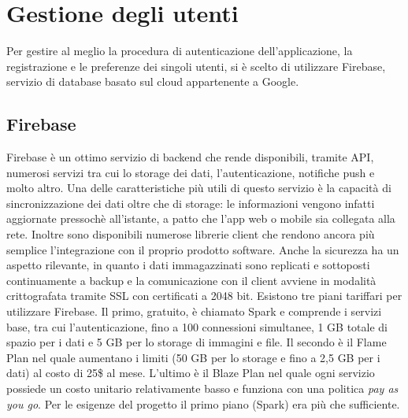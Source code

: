 \section{Gestione degli utenti}
Per gestire al meglio la procedura di autenticazione dell'applicazione, la
registrazione e le preferenze dei singoli utenti, si è scelto di utilizzare
Firebase, servizio di database basato sul cloud appartenente a Google.

\subsection{Firebase}
Firebase è un ottimo servizio di backend che rende disponibili, tramite API,
numerosi servizi tra cui lo storage dei dati, l'autenticazione, notifiche push e
molto altro. Una delle caratteristiche più utili di questo servizio è la
capacità di sincronizzazione dei dati oltre che di storage: le informazioni
vengono infatti aggiornate pressochè all'istante, a patto che l'app web o mobile
sia collegata alla rete. Inoltre sono disponibili numerose librerie client che
rendono ancora più semplice l'integrazione con il proprio prodotto software.
Anche la sicurezza ha un aspetto rilevante, in quanto i dati immagazzinati sono
replicati e sottoposti continuamente a backup e la comunicazione con il client
avviene in modalità crittografata tramite SSL con certificati a 2048 bit.
Esistono tre piani tariffari per utilizzare Firebase. Il primo, gratuito, è
chiamato Spark e comprende i servizi base, tra cui l'autenticazione, fino a 100
connessioni simultanee, 1 GB totale di spazio per i dati e 5 GB per lo storage
di immagini e file. Il secondo è il Flame Plan nel quale aumentano i limiti (50
GB per lo storage e fino a 2,5 GB per i dati) al costo di 25\$ al mese.
L'ultimo è il Blaze Plan nel quale ogni servizio possiede un costo unitario
relativamente basso e funziona con una politica \textit{pay as you go}. Per le
esigenze del progetto il primo piano (Spark) era più che sufficiente.

